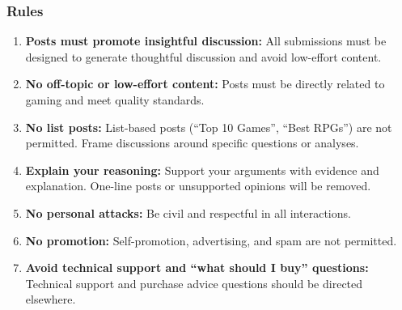 \subsubsection{Rules}
\begin{enumerate}
    \item \textbf{Posts must promote insightful discussion:} All submissions must be designed to generate thoughtful discussion and avoid low-effort content.
    
    \item \textbf{No off-topic or low-effort content:} Posts must be directly related to gaming and meet quality standards.
    
    \item \textbf{No list posts:} List-based posts (``Top 10 Games'', ``Best RPGs'') are not permitted. Frame discussions around specific questions or analyses.
    
    \item \textbf{Explain your reasoning:} Support your arguments with evidence and explanation. One-line posts or unsupported opinions will be removed.
    
    \item \textbf{No personal attacks:} Be civil and respectful in all interactions.
    
    \item \textbf{No promotion:} Self-promotion, advertising, and spam are not permitted.
    
    \item \textbf{Avoid technical support and ``what should I buy'' questions:} Technical support and purchase advice questions should be directed elsewhere.
\end{enumerate}